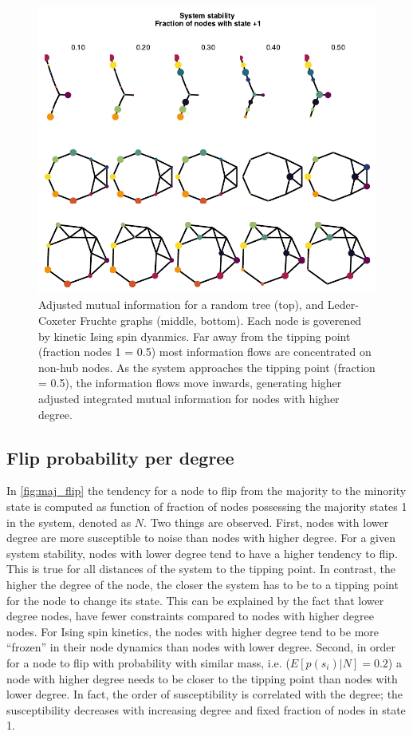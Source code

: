 \documentclass[a4paper, 11pt, twocolumn]{article}
\begin{document}
\begin{figure}
\centering
\includegraphics[width=.9\linewidth]{./figures/imi_other_graphs.pdf}
\caption{\label{fig:other_systems}Adjusted mutual information for a random tree (top), and Leder-Coxeter Fruchte graphs (middle, bottom). Each node is goverened by kinetic Ising spin dyanmics. Far away from the tipping point (fraction nodes 1 = 0.5) most information flows are concentrated on non-hub nodes. As the system approaches the tipping point (fraction = 0.5), the information flows move inwards, generating higher adjusted integrated mutual information for nodes with higher degree.}
\end{figure}

\subsection{Flip probability per degree}
\label{sec:deg_flip}
In \cref{fig:maj_flip} the tendency for a node
to flip from the majority  to the minority state is computed
as  function of  fraction of  nodes possessing  the majority
states 1  in the system,  denoted as \(N\). Two  things are
observed.   First,  nodes   with  lower   degree  are   more
susceptible to  noise than nodes  with higher degree.  For a
given system stability, nodes with lower degree tend to have
a higher tendency to flip. This is true for all distances of
the system to the tipping point. In contrast, the higher the
degree of  the node, the  closer the system  has to be  to a
tipping point for the node to  change its state. This can be
explained by  the fact that  lower degree nodes,  have fewer
constraints compared to nodes  with higher degree nodes. For
Ising spin kinetics, the nodes with higher degree tend to be
more ``frozen'' in  their node dynamics than  nodes with lower
degree. Second, in order for a node to flip with probability
with similar  mass, i.e.  (\(E[p(s_i) | N]  = 0.2\))  a node
with higher degree  needs to be closer to  the tipping point
than  nodes  with  lower  degree.  In  fact,  the  order  of
susceptibility   is   correlated   with  the   degree;   the
susceptibility  decreases with  increasing degree  and fixed
fraction of nodes in state 1.
\end{document}
